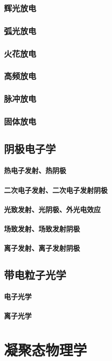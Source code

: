 \documentclass[UTF8]{../06-Physics}
\begin{document}
    \subsection{辉光放电}
    \subsection{弧光放电}
    \subsection{火花放电}
    \subsection{高频放电}
    \subsection{脉冲放电}
    \subsection{固体放电}
\section{阴极电子学}
    \subsubsection{热电子发射、热阴极}
    \subsubsection{二次电子发射、二次电子发射阴极}
    \subsubsection{光致发射、光阴极、外光电效应}
    \subsubsection{场致发射、场致发射阴极}
    \subsubsection{离子发射、离子发射阴极}
\section{带电粒子光学}
    \subsubsection{电子光学}
    \subsubsection{离子光学}



\chapter{凝聚态物理学}
\end{document}
